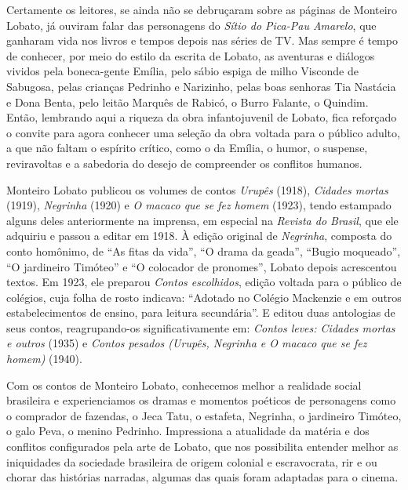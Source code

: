 
Certamente os leitores, se ainda não se debruçaram sobre as páginas de
Monteiro Lobato, já ouviram falar das personagens do \emph{Sítio do
Pica-Pau Amarelo}, que ganharam vida nos livros e tempos depois nas
séries de TV. Mas sempre é tempo de conhecer, por meio do estilo da
escrita de Lobato, as aventuras e diálogos vividos pela boneca-gente
Emília, pelo sábio espiga de milho Visconde de Sabugosa, pelas crianças
Pedrinho e Narizinho, pelas boas senhoras Tia Nastácia e Dona Benta,
pelo leitão Marquês de Rabicó, o Burro Falante, o Quindim. Então,
lembrando aqui a riqueza da obra infantojuvenil de Lobato, fica
reforçado o convite para agora conhecer uma seleção da obra voltada para
o público adulto, a que não faltam o espírito crítico, como o da Emília,
o humor, o suspense, reviravoltas e a sabedoria do desejo de compreender
os conflitos humanos.

Monteiro Lobato publicou os volumes de contos \emph{Urupês} (1918),
\emph{Cidades mortas} (1919), \emph{Negrinha} (1920) e \emph{O macaco
que se fez homem} (1923), tendo estampado alguns deles anteriormente na
imprensa, em especial na \emph{Revista do Brasil}, que ele adquiriu e
passou a editar em 1918. À edição original de \emph{Negrinha}, composta
do conto homônimo, de ``As fitas da vida'', ``O drama da geada'',
``Bugio moqueado'', ``O jardineiro Timóteo'' e ``O colocador de
pronomes'', Lobato depois acrescentou textos. Em 1923, ele preparou
\emph{Contos escolhidos}, edição voltada para o público de colégios,
cuja folha de rosto indicava: ``Adotado no Colégio Mackenzie e em outros
estabelecimentos de ensino, para leitura secundária''. E editou duas
antologias de seus contos, reagrupando-os significativamente em:
\emph{Contos leves: Cidades mortas e outros} (1935) e \emph{Contos
pesados (Urupês, Negrinha e O macaco que se fez homem)} (1940).

Com os contos de Monteiro Lobato, conhecemos melhor a realidade social
brasileira e experienciamos os dramas e momentos poéticos de personagens
como o comprador de fazendas, o Jeca Tatu, o estafeta, Negrinha, o
jardineiro Timóteo, o galo Peva, o menino Pedrinho. Impressiona a
atualidade da matéria e dos conflitos configurados pela arte de Lobato,
que nos possibilita entender melhor as iniquidades da sociedade
brasileira de origem colonial e escravocrata, rir e ou chorar das
histórias narradas, algumas das quais foram adaptadas para o cinema.

